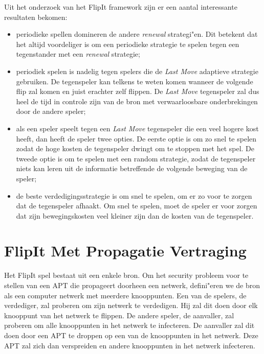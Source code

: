 \documentclass[master=cws, masteroption=vs,english]{kulemt}
\begin{document}
\begin{abstract*}
Uit het onderzoek van het FlipIt framework zijn er een aantal interessante resultaten bekomen:
\begin{itemize}
\item periodieke spellen domineren de andere \textit{renewal }strategi"en. Dit betekent dat het altijd voordeliger is om een periodieke strategie te spelen tegen een tegenstander met een \textit{renewal} strategie;
\item periodiek spelen is nadelig tegen spelers die de\textit{ Last Move} adaptieve strategie gebruiken. De tegenspeler kan telkens te weten komen wanneer de volgende flip zal komen en juist erachter zelf flippen. De \textit{Last Move} tegenspeler zal dus heel de tijd in controle zijn van de bron met verwaarloosbare onderbrekingen door de andere speler;
\item als een speler speelt tegen een \textit{Last Move} tegenspeler die een veel hogere kost heeft, dan heeft de speler twee opties. De eerste optie is om zo snel te spelen zodat de hoge kosten de tegenspeler dwingt om te stoppen met het spel. De tweede optie is om te spelen met een random strategie, zodat de tegenspeler niets kan leren uit de informatie betreffende de volgende beweging van de speler;
\item de beste verdedigingsstrategie is om snel te spelen, om er zo voor te zorgen dat de tegenspeler afhaakt. Om snel te spelen, moet de speler er voor zorgen dat zijn bewegingskosten veel kleiner zijn dan de kosten van de tegenspeler.
\end{itemize}


\section {FlipIt Met Propagatie Vertraging}
\label{ch: flipitvirus}
Het FlipIt spel bestaat uit een enkele bron. Om het security probleem voor te stellen van een APT die propageert doorheen een netwerk, defini"eren we de bron als een computer netwerk met meerdere knooppunten. Een van de spelers, de verdediger, zal proberen om zijn netwerk te verdedigen. Hij zal dit doen door elk knooppunt van het netwerk te flippen. De andere speler, de aanvaller, zal proberen om alle knooppunten in het netwerk te infecteren. De aanvaller zal dit doen door een APT te droppen op een van de knooppunten in het netwerk. Deze APT zal zich dan verspreiden en andere knooppunten in het netwerk infecteren. \\


\end{abstract*}
\end{document}
